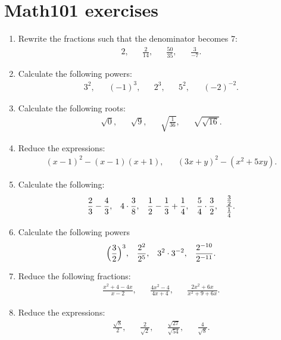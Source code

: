 \section{Math101 exercises}

\begin{enumerate}
\item Rewrite the fractions such that the denominator becomes 7:
\begin{align*}
2,&&  \frac{2}{14},&&  \frac{50}{35},&& \frac{3}{-7}.%
\end{align*}

\item Calculate the following powers:
\begin{align*}
3^2,&& (-1)^{3},&& 2^3,&& 5^2,&& (-2)^{-2}.
\end{align*}

\item Calculate the following roots:
\begin{align*}
\sqrt{0},&& \sqrt{9},&& \sqrt{\frac{1}{36}},&& \sqrt{\sqrt{16}}.
\end{align*}
\item Reduce the expressions:
\begin{align*}
(x-1)^2-(x-1)(x+1),&& (3x+y)^2-(x^2+5xy).
\end{align*}

\item Calculate the following:
\begin{align*}
\frac{2}{3}-\frac{4}{3},&&4\cdot\frac{3}{8},&& \frac{1}{2}-\frac{1}{3}+\frac{1}{4},&& \frac{5}{4}\cdot \frac{3}{2},&& \frac{\frac{3}{2}}{\frac{1}{4}}.
\end{align*}

\item Calculate the following powers
\begin{align*}
\Big(\frac{3}{2}\Big)^3,&& \frac{2^2}{2^5},&& 3^2\cdot 3^{-2},&& \frac{2^{-10}}{2^{-11}}.
\end{align*}

\item Reduce the following fractions:
\begin{align*}
\frac{x^2+4-4x}{x-2},&& \frac{4x^2-4}{4x+4},&&\frac{2x^2+6x}{x^2+9+6x}.
\end{align*}

\item Reduce the expressions:
\begin{align*}
\frac{\sqrt{8}}{2},&& \frac{2}{\sqrt{2}},&& \frac{\sqrt{27}}{\sqrt{54}},&& \frac{4}{\sqrt{8}}.
\end{align*}


\end{enumerate}
